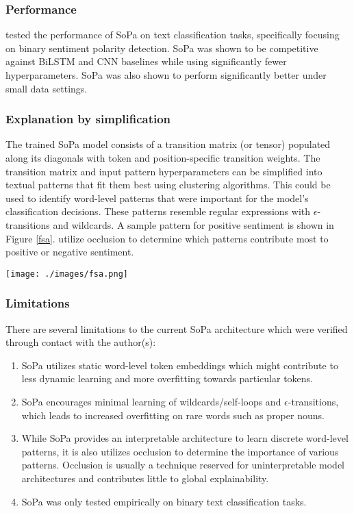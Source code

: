 \subsubsection{Performance}

\citet{schwartz2018sopa} tested the performance of SoPa on text classification tasks, specifically focusing on binary sentiment polarity detection. SoPa was shown to be competitive against BiLSTM and CNN baselines while using significantly fewer hyperparameters. SoPa was also shown to perform significantly better under small data settings. 

\subsubsection{Explanation by simplification}

The trained SoPa model consists of a transition matrix (or tensor) populated along its diagonals with token and position-specific transition weights. The transition matrix and input pattern hyperparameters can be simplified into textual patterns that fit them best using clustering algorithms. This could be used to identify word-level patterns that were important for the model's classification decisions. These patterns resemble regular expressions with $\epsilon$-transitions and wildcards. A sample pattern for positive sentiment is shown in Figure \ref{fsa}. \citet{schwartz2018sopa} utilize occlusion to determine which patterns contribute most to positive or negative sentiment.

\begin{figure*}
  \centering 
  \texttt{[image: ./images/fsa.png]} 
  \caption{Example mimic FSA simplified from SoPa and its corresponding WFSAs \citep{schwartz2018sopa}}
  \label{fsa}
\end{figure*}

\subsubsection{Limitations}
\label{sopa-limitations}

There are several limitations to the current SoPa architecture which were verified through contact with the author(s):

\begin{enumerate}
  \item SoPa utilizes static word-level token embeddings which might contribute to less dynamic learning and more overfitting towards particular tokens.
  \item SoPa encourages minimal learning of wildcards/self-loops and $\epsilon$-transitions, which leads to increased overfitting on rare words such as proper nouns.
  \item While SoPa provides an interpretable architecture to learn discrete word-level patterns, it is also utilizes occlusion to determine the importance of various patterns. Occlusion is usually a technique reserved for uninterpretable model architectures and contributes little to global explainability.
  \item SoPa was only tested empirically on binary text classification tasks.  
\end{enumerate}

